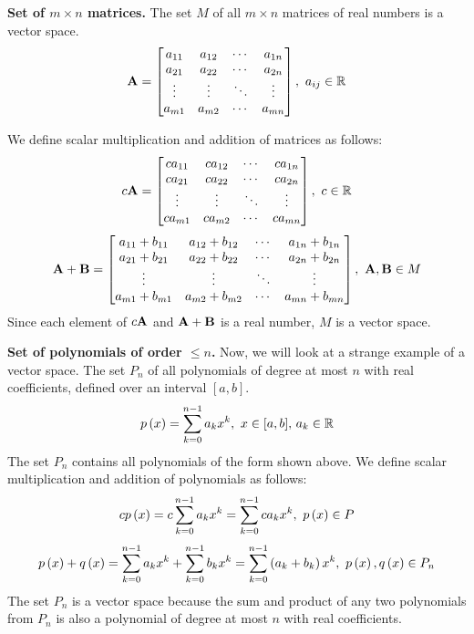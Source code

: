\begin{boxedstuff}
\begin{example}
    \textbf{Set of $m \times n$ matrices.} The set $M$ of all $m \times n$ matrices of real numbers is a vector space.
    \[ \mf{A} = \bmxc
        a_{11} & a_{12} & \cdots & a_{1n} \\
        a_{21} & a_{22} & \cdots & a_{2n} \\
        \vdots & \vdots & \ddots & \vdots \\
        a_{m1} & a_{m2} & \cdots & a_{mn}
    \emx, \,\, a_{ij} \in \mb{R} \]

    We define scalar multiplication and addition of matrices as follows:
    \[ c\mf{A} = \bmxc
        ca_{11} & ca_{12} & \cdots & ca_{1n} \\
        ca_{21} & ca_{22} & \cdots & ca_{2n} \\
        \vdots & \vdots & \ddots & \vdots \\
        ca_{m1} & ca_{m2} & \cdots & ca_{mn}
    \emx, \,\, c \in \mb{R} \]
    \[ \mf{A} + \mf{B} = \bmxc
        a_{11} + b_{11} & a_{12} + b_{12} & \cdots & a_{1n} + b_{1n} \\
        a_{21} + b_{21} & a_{22} + b_{22} & \cdots & a_{2n} + b_{2n} \\
        \vdots & \vdots & \ddots & \vdots \\
        a_{m1} + b_{m1} & a_{m2} + b_{m2} & \cdots & a_{mn} + b_{mn}
    \emx, \,\, \mf{A}, \mf{B} \in M
    \]
    Since each element of $c\mathbf{A}$ and $\mathbf{A} + \mathbf{B}$ is a real number, $M$ is a vector space.
    \label{example:matrix-vector-space}
\end{example}
\begin{example}
    \textbf{Set of polynomials of order $\leq n$.} Now, we will look at a strange example of a vector space. The set $P_n$ of all polynomials of degree at most $n$ with real coefficients, defined over an interval $[a, b]$.
    \[ p\left( x \right) = \sum_{k=0}^{n-1} a_k x^k, \,\, x \in [a, b], \, a_k \in \mathbb{R} \]
    The set $P_n$ contains all polynomials of the form shown above. We define scalar multiplication and addition of polynomials as follows:
    \[ c p\left( x \right) = c \sum_{k=0}^{n-1} a_k x^k = \sum_{k=0}^{n-1} ca_k x^k, \,\, p\left( x\right) \in P \]
    \[ p\left( x \right) + q\left( x \right) = \sum_{k=0}^{n-1} a_k x^k + \sum_{k=0}^{n-1} b_k x^k = \sum_{k=0}^{n-1} \left( a_k + b_k \right) x^k, \,\, p\left( x \right), q\left( x \right) \in P_n \]
    The set $P_n$ is a vector space because the sum and product of any two polynomials from $P_n$ is also a polynomial of degree at most $n$ with real coefficients.

\end{example}
\end{boxedstuff}

